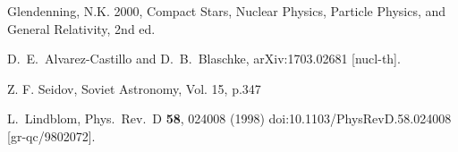 \documentclass[12pt]{article}
\begin{document}
\begin{thebibliography}{widestlabel}
	Glendenning, N.K. 2000, Compact Stars, Nuclear Physics, Particle Physics, and General Relativity, 2nd ed.
	
	D.~E.~Alvarez-Castillo and D.~B.~Blaschke,
	arXiv:1703.02681 [nucl-th].
	
	Z. F. Seidov, 
	Soviet Astronomy, Vol. 15, p.347
	
	L.~Lindblom,
	Phys.\ Rev.\ D {\bf 58}, 024008 (1998)
	doi:10.1103/PhysRevD.58.024008
	[gr-qc/9802072].
	
	
\end{thebibliography}
\end{document}
